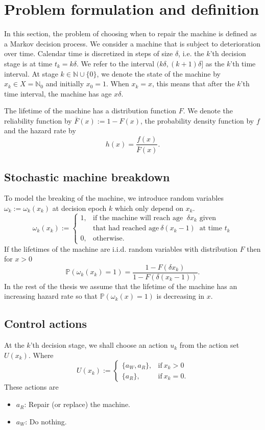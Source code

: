 \documentclass[a4paper]{thesis}
\theoremstyle{definition}
\begin{document}
\section{Problem formulation and definition}\label{section:AgeBasedDefinition}
In this section, the problem of choosing when to repair the machine is defined as a Markov decision process.
We consider a machine that is subject to deterioration over time.
Calendar time is discretized in steps of size $\delta$, i.e. the $k$'th decision stage is at time $t_k=k\delta$.
We refer to the interval $(k\delta,(k+1)\delta]$ as the $k$'th time interval.
At stage $k\in\mathbb{N}\cup\{0\}$, we denote the state of the machine by $x_k\in X=\mathbb{N}_0$ and initially $x_0=1$.
When $x_k=x$, this means that after the $k$'th time interval, the machine has age $x\delta$.

The lifetime of the machine has a distribution function $F$.
We denote the reliability function by $\bar F(x):=1-F(x)$, the probability density function by $f$ and the hazard rate by 
\[
h(x)=\frac{f(x)}{\bar F(x)}.
\] 

\subsection{Stochastic machine breakdown}
To model the breaking of the machine, we introduce random variables $\omega_k:=\omega_k(x_k)$ at decision epoch $k$ which only depend on $x_k$.
$$
\omega_k(x_k):=\begin{cases}
1,&\text{if the machine will reach age }\ \delta x_{k}\text{ given}\\
&\text{that had reached age}\ \delta(x_k-1)\ \text{ at time } t_k \\
0,&\text{otherwise}.
\end{cases}
$$
If the lifetimes of the machine are i.i.d. random variables with distribution $F$ then for $x>0$
$$
\mathbb{P}(\omega_k(x_k)=1)=\frac{1-F(\delta x_k)}{1-F(\delta (x_k-1))}.
$$
In the rest of the thesis we assume that the lifetime of the machine has an increasing hazard rate so that $\mathbb{P}(\omega_k(x)=1)$ is decreasing in $x$.

\subsection{Control actions}
At the $k$'th decision stage, we shall choose an action $u_k$ from the action set $U(x_k)$.
Where
$$
U(x_k):=\begin{cases}
\{a_W,a_R\},&\text{if}\ x_k>0 \\
\{a_R\},&\text{if}\ x_k=0.
\end{cases}
$$
These actions are
\begin{itemize}
	\item $a_R$:
	Repair (or replace) the machine.
	\item $a_W$:
	Do nothing.
\end{itemize}
\end{document}
